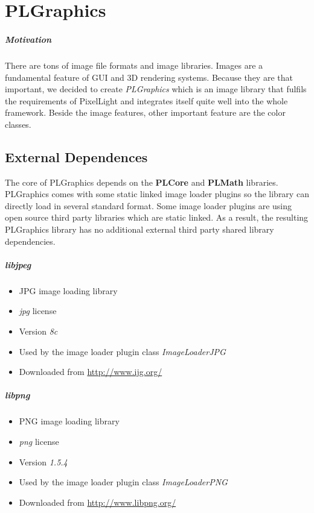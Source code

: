 \chapter{PLGraphics}


\paragraph{Motivation}
There are tons of image file formats and image libraries. Images are a fundamental feature of \ac{GUI} and 3D rendering systems. Because they are that important, we decided to create \emph{PLGraphics} which is an image library that fulfils the requirements of PixelLight and integrates itself quite well into the whole framework. Beside the image features, other important feature are the color classes.




\section{External Dependences}
The core of PLGraphics depends on the \textbf{PLCore} and \textbf{PLMath} libraries. PLGraphics comes with some static linked image loader plugins so the library can directly load in several standard format. Some image loader plugins are using open source third party libraries which are static linked. As a result, the resulting PLGraphics library has no additional external third party shared library dependencies.


\paragraph{libjpeg}
\begin{itemize}
\item JPG image loading library
\item \emph{jpg} license
\item Version \emph{8c}
\item Used by the image loader plugin class \emph{ImageLoaderJPG}
\item Downloaded from \url{http://www.ijg.org/}
\end{itemize}


\paragraph{libpng}
\begin{itemize}
\item PNG image loading library
\item \emph{png} license
\item Version \emph{1.5.4}
\item Used by the image loader plugin class \emph{ImageLoaderPNG}
\item Downloaded from \url{http://www.libpng.org/}
\end{itemize}





\cleardoublepage
